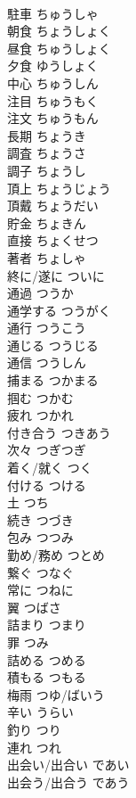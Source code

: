 \documentclass[8pt]{extreport}
\begin{document}
\begin{CJK}{UTF8}{min}
\\	駐車	ちゅうしゃ	
\\	朝食	ちょうしょく	
\\	昼食	ちゅうしょく	
\\	夕食	ゆうしょく	
\\	中心	ちゅうしん	
\\	注目	ちゅうもく	
\\	注文	ちゅうもん	
\\	長期	ちょうき	
\\	調査	ちょうさ	
\\	調子	ちょうし	
\\	頂上	ちょうじょう	
\\	頂戴	ちょうだい	
\\	貯金	ちょきん	
\\	直接	ちょくせつ	
\\	著者	ちょしゃ	
\\	終に/遂に	ついに	
\\	通過	つうか	
\\	通学する	つうがく	
\\	通行	つうこう	
\\	通じる	つうじる	
\\	通信	つうしん	
\\	捕まる	つかまる	
\\	掴む	つかむ	
\\	疲れ	つかれ	
\\	付き合う	つきあう	
\\	次々	つぎつぎ	
\\	着く/就く	つく	
\\	付ける	つける	
\\	土	つち	
\\	続き	つづき	
\\	包み	つつみ	
\\	勤め/務め	つとめ	
\\	繋ぐ	つなぐ	
\\	常に	つねに	
\\	翼	つばさ	
\\	詰まり	つまり	
\\	罪	つみ	
\\	詰める	つめる	
\\	積もる	つもる	
\\	梅雨	つゆ/ばいう	
\\	辛い	うらい	
\\	釣り	つり	
\\	連れ	つれ	
\\	出会い/出合い	であい	
\\	出会う/出合う	であう	

\end{CJK}
\end{document}
